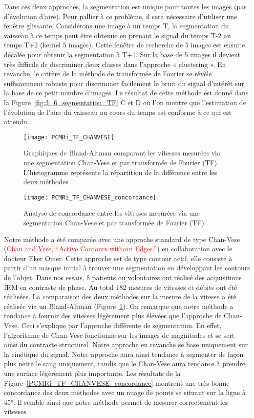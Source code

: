 Dans ces deux approches, la segmentation est unique pour toutes les images (pas d’évolution
d’aire). Pour pallier à ce problème, il sera nécessaire d’utiliser une fenêtre glissante. Considérons une image à un temps T, la segmentation du vaisseau à ce temps peut être
obtenue en prenant le signal du temps T-2 au temps T+2 (kernel 5 images). Cette fenêtre de recherche
de 5 images est ensuite décalée pour obtenir la segmentation à T+1. Sur la base de 5 images il devient
très difficile de discriminer deux classes dans l’approche « clustering ». En revanche, le critère de la
méthode de transformée de Fourier se révèle suffisamment robuste pour discriminer facilement le
bruit du signal d’intérêt sur la base de ce petit nombre d’images. Le résultat de cette méthode est
donné dans la Figure~\ref{fig:3_6_segmentation_TF} C et D où l’on montre que l’estimation de l’évolution de l’aire du vaisseau au cours du temps est conforme à ce qui est attendu.


\begin{figure}[!t]
\centering
\texttt{[image: PCMRi\_TF\_CHANVESE]}
\caption{Graphiques de Bland-Altman comparant les vitesses mesurées via une segmentation Chan-Vese et par transformée de Fourier (TF). L'histogramme représente la répartition de la différence entre les deux méthodes.}
\label{fig:PCMRi_TF_CHANVESE}	
\end{figure}

\begin{figure}[!t]
\centering
\texttt{[image: PCMRi\_TF\_CHANVESE\_concordance]}
\caption{Analyse de concordance entre les vitesses mesurées via une segmentation Chan-Vese et par transformée de Fourier (TF).}
\label{fig:PCMRi_TF_CHANVESE_concordance}	
\end{figure}

Notre méthode a été comparée avec une approche standard de type Chan-Vese (\textcolor{red}{Chan and Vese, “Active Contours without Edges.”}) en collaboration avec le docteur Eker Omer. Cette approche est de type contour actif, elle consiste à partir d'un masque initial à trouver une segmentation en développant les contours de l'objet. Dans nos essais, 8 patients ou volontaires ont réalisé des acquisitions IRM en contraste de phase. Au total 182 mesures de vitesses et débits ont été réalisées. La comparaison des deux méthodes sur la mesure de la vitesse a été réalisée via un Bland-Altman (Figure~\ref{fig:PCMRi_TF_CHANVESE}). On remarque que notre méthode a tendance à fournir des vitesses légèrement plus élevées que l'approche de Chan-Vese. Ceci s'explique par l'approche différente de segmentation. En effet, l'algorithme de Chan-Vese fonctionne sur les images de magnitudes et se sert ainsi du contraste structurel. Notre approche en revanche se base uniquement sur la cinétique du signal. Notre approche aura ainsi tendance à segmenter de façon plus nette le sang uniquement, tandis que le Chan-Vese aura tendance à prendre une surface légèrement plus importante. Les résultats de la Figure~\ref{PCMRi_TF_CHANVESE_concordance} montrent une très bonne concordance des deux méthodes avec un nuage de points se situant sur la ligne à 45°. Il semble ainsi que notre méthode permet de mesurer correctement les vitesses.
